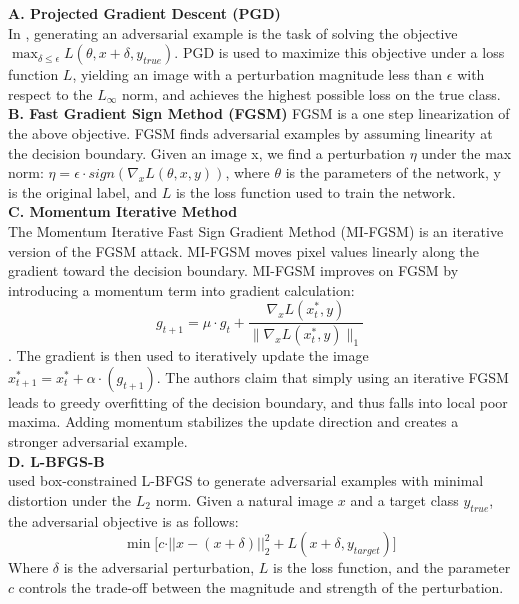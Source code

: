 \documentclass{article} %
\begin{document}
\noindent \textbf{A. Projected Gradient Descent (PGD)}\\
In \citep{lyu2015unified,madry2017towards}, generating an adversarial example is the task of solving the objective $\max_{\delta\leq\epsilon} L(\theta, x + \delta, y_{true})$. 
PGD is used to maximize this objective under a loss function $L$, yielding an image with a perturbation magnitude less than $\epsilon$ with respect to the $L_\infty$ norm, and achieves the highest possible loss on the true class. \\

\noindent \textbf{B. Fast Gradient Sign Method (FGSM)}
FGSM \citep{goodfellow2015explaining} is a one step linearization of the above objective. FGSM finds adversarial examples by assuming linearity at the decision boundary. Given an image x, we find a perturbation $\eta$ under the max norm: $\eta = \epsilon \cdot sign(\nabla_x L(\theta, x, y))$, where $\theta$ is the parameters of the network, y is the original label, and $L$ is the loss function used to train the network.
\\

\noindent \textbf{C. Momentum Iterative Method}\\
The Momentum Iterative Fast Sign Gradient Method (MI-FGSM) \citep{dong2018boosting} is an iterative version of the FGSM attack. MI-FGSM moves pixel values linearly along the gradient toward the decision boundary. MI-FGSM improves on FGSM by introducing a momentum term into gradient calculation: 
\[
g_{t+1} = \mu \cdot g_t + \frac{\nabla_x L(x^*_t, y)}{\|\nabla_x L(x^*_t, y)\|_1}
\]. 
The gradient is then used to iteratively update the image $x^*_{t+1} = x^*_t + \alpha \cdot (g_{t+1})$. The authors claim that simply using an iterative FGSM leads to greedy overfitting of the decision boundary, and thus falls into local poor maxima. Adding momentum stabilizes the update direction and creates a stronger adversarial example. 
\\

\noindent \textbf{D. L-BFGS-B}\\
\citep{szegedy2014intriguing} used box-constrained L-BFGS to generate adversarial examples with minimal distortion under the $L_2$ norm. Given a natural image $x$ and a target class $y_{true}$, the adversarial objective is as follows: 
\[ \min \Big[ c \cdot \vert \vert x - (x + \delta) \vert \vert^{2}_{2} + L(x+\delta, y_{target}) \Big] \]
Where $\delta$ is the adversarial perturbation, $L$ is the loss function, and the parameter $c$ controls the trade-off between the magnitude and strength of the perturbation. 
\\
\end{document}
